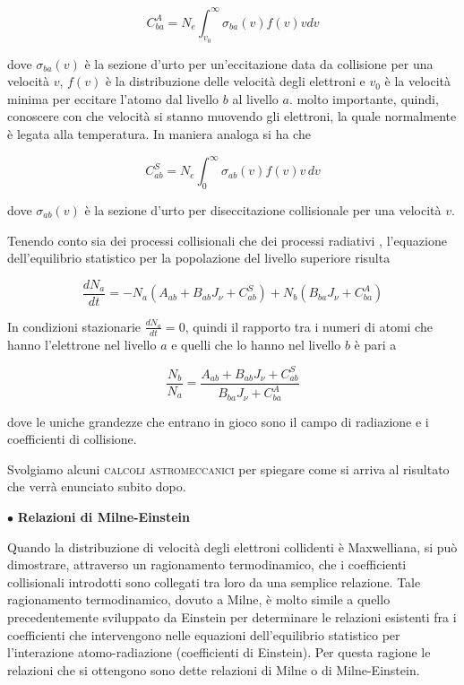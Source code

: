 $$C_{ba}^A=N_e \int_{v_0}^{\infty}\sigma_{ba}(v)f(v)vdv$$

dove $\sigma_{ba}(v)$ è la sezione d'urto per un'eccitazione data da collisione per una velocità $v$, $f(v)$ è la distribuzione delle velocità degli elettroni e $v_0$ è la velocità minima per eccitare l'atomo dal livello $b$ al livello $a$. \E molto importante, quindi, conoscere con che velocità si stanno muovendo gli elettroni, la quale normalmente è legata alla temperatura. In maniera analoga si ha che 

$$C_{ab}^S=N_e\int_{0}^{\infty}\sigma_{ab}(v)f(v)v\,dv$$

dove $\sigma_{ab}(v)$ è la sezione d'urto per diseccitazione collisionale per una velocità $v$.

Tenendo conto sia dei processi collisionali che dei processi radiativi , l'equazione dell'equilibrio statistico per la popolazione del livello superiore risulta

$$\frac{dN_a}{dt}=-N_a (A_{ab} + B_{ab}J_\nu + C_{ab}^S)+ N_b(B_{ba}J_\nu + C_{ba}^A)$$

In condizioni stazionarie $\displaystyle \frac{dN_a}{dt}=0$, quindi il rapporto tra i numeri di atomi che hanno l'elettrone nel livello $a$ e quelli che lo hanno nel livello $b$ è pari a

$$\frac{N_b}{N_a}=\frac{A_{ab}+B_{ab}J_\nu +C_{ab}^S}{B_{ba}J_\nu+C_{ba}^A}$$

dove le uniche grandezze che entrano in gioco sono il campo di radiazione e i coefficienti di collisione.

\hrulefill

Svolgiamo alcuni \textsc{calcoli astromeccanici} per spiegare come si arriva al risultato che verrà enunciato subito dopo.

\vspace{0.2cm}$\bullet$ \textbf{Relazioni di Milne-Einstein}

\vspace{0.2cm}Quando la distribuzione di velocità degli elettroni collidenti è Maxwelliana, si può dimostrare, attraverso un ragionamento termodinamico, che i coefficienti collisionali introdotti sono collegati tra loro da una semplice relazione. Tale ragionamento termodinamico, dovuto a Milne, è molto simile a quello precedentemente sviluppato da Einstein per determinare le relazioni esistenti fra i coefficienti che intervengono nelle equazioni dell'equilibrio statistico per l'interazione atomo-radiazione (coefficienti di Einstein). Per questa ragione le relazioni che si ottengono sono dette relazioni di Milne o di Milne-Einstein.

